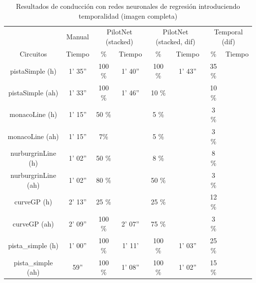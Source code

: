 \begin{table}[H]
\centering
\caption{Resultados de conducción con redes neuronales de regresión introduciendo temporalidad (imagen completa)}
\label{resultados_regresion_temporal_completa}
\begin{tabular}{c|c|c|c|c|c|c|c|}
\cline{2-8}
                          & \multicolumn{1}{c|}{Manual} & \multicolumn{2}{c|}{PilotNet (stacked)} & \multicolumn{2}{c|}{PilotNet (stacked, dif)} & \multicolumn{2}{c|}{Temporal (dif)} \\ \cline{1-8} 
                        \multicolumn{1}{|c|}{Circuitos}    & Tiempo       & \%       & Tiempo       & \%        & Tiempo  & \%        & Tiempo          \\ \hline
\multicolumn{1}{|c|}{pistaSimple (h)}    & 1' 35''      & 100 \%     & 1' 40''  & 100 \%     & 1' 43''   & 35 \%       &     \\ \hline
\multicolumn{1}{|c|}{pistaSimple (ah)}     & 1' 33''           & 100 \%   & 1' 46''    & 10 \%        &   & 10 \%       &  \\ \hline
\multicolumn{1}{|c|}{monacoLine (h)}      & 1' 15''           & 50 \%         &         & 5 \%           &     & 3 \%        &                 \\ \hline
\multicolumn{1}{|c|}{monacoLine (ah)}       & 1' 15''    & 7\%      &         & 5 \%          &    & 3 \%       &        \\ \hline
\multicolumn{1}{|c|}{nurburgrinLine (h)}      & 1' 02''       & 50 \%       &          & 8 \%        &     & 8 \%        &     \\ \hline
\multicolumn{1}{|c|}{nurburgrinLine (ah)}       & 1' 02''     & 80 \%    &      & 50 \%     &   & 3 \%        &            \\ \hline
\multicolumn{1}{|c|}{curveGP (h)}     & 2' 13''      & 25 \%       &      & 25 \%     &     &  12 \%       &           \\ \hline
\multicolumn{1}{|c|}{curveGP (ah)}       & 2' 09''            & 100 \%     & 2' 07''     &  75 \%     &   & 3 \%      &        \\ \hline
\multicolumn{1}{|c|}{pista\_simple (h)}       & 1' 00''           & 100 \%     & 1' 11'      & 100 \%       & 1' 03''    & 25 \%      &         \\ \hline
\multicolumn{1}{|c|}{pista\_simple (ah)}     & 59''      & 100 \%     & 1' 08''     & 100 \%       & 1' 02''    & 15 \%      &                \\ \hline
\end{tabular}
\end{table}


